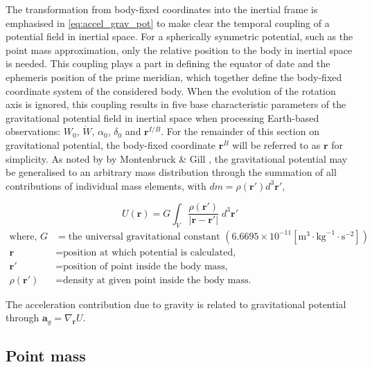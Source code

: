 The transformation from body-fixed coordinates into the inertial frame is
emphasised in \autoref{eq:accel_grav_pot} to make clear the temporal coupling of
a potential field in inertial space. For a spherically symmetric potential, such
as the point mass approximation, only the relative position to the body in
inertial space is needed. This coupling plays a part in defining the equator of
date and the ephemeris position of the prime meridian, which together define the
body-fixed coordinate system of the considered body. When the evolution of the
rotation axis is ignored, this coupling results in five base characteristic
parameters of the gravitational potential field in inertial space when
processing Earth-based observations: $W_0$, $\dot{W}$, $\alpha_0$, $\delta_0$
and $\mathbf{r}^{I/B}$. For the remainder of this section on gravitational
potential, the body-fixed coordinate $\mathbf{r}^B$ will be referred to as
$\mathbf{r}$ for simplicity. As noted by by Montenbruck \& Gill
\cite{Montenbruck2000}, the gravitational potential may be generalised to an
arbitrary mass distribution through the summation of all contributions of
individual mass elements, with $dm=\rho{(\mathbf{r'})}d^3\mathbf{r'}$,

\begin{equation}
    U(\mathbf{r}) = G\int_V \frac{\rho{(\mathbf{r'})}}{|\mathbf{r}-\mathbf{r'}|}\;d^3\mathbf{r'}
\end{equation}
\begin{equation*}
    \begin{aligned}
        \textrm{where, }
        G &= \textrm{the universal gravitational constant }(6.6695\times{}10^{-11} [\textrm{m}^3\cdot{}\textrm{kg}^{-1}\cdot{}\textrm{s}^{-2}])\\
        \mathbf{r}       &= \textrm{position at which potential is calculated,} \\
        \mathbf{r'}       &= \textrm{position of point inside the body mass,}\\
        \rho(\mathbf{r'}) &= \textrm{density at given point inside the body mass.}
    \end{aligned}
\end{equation*}

The acceleration contribution due to gravity is related to gravitational
potential through $\mathbf{a}_g=\nabla_\mathbf{r}{U}$.

\subsection{Point mass}

